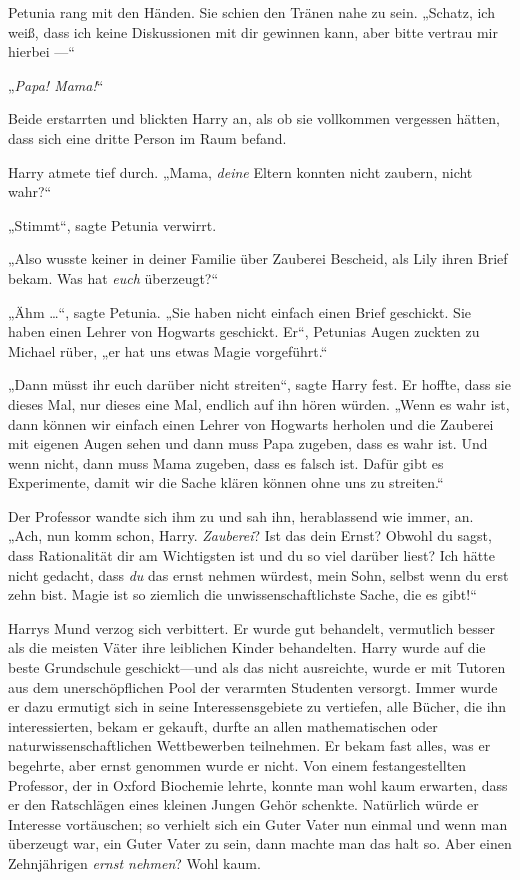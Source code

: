 {Petunia rang mit den Händen. Sie schien den Tränen nahe zu sein. „Schatz, ich weiß, dass ich keine Diskussionen mit dir gewinnen kann, aber bitte vertrau mir hierbei —“

„\emph{Papa! Mama!}“

Beide erstarrten und blickten Harry an, als ob sie vollkommen vergessen hätten, dass sich eine dritte Person im Raum befand.

Harry atmete tief durch. „Mama, \emph{deine} Eltern konnten nicht zaubern, nicht wahr?“

„Stimmt“, sagte Petunia verwirrt.

„Also wusste keiner in deiner Familie über Zauberei Bescheid, als Lily ihren Brief bekam. Was hat \emph{euch} überzeugt?“

„Ähm …“, sagte Petunia. „Sie haben nicht einfach einen Brief geschickt. Sie haben einen Lehrer von Hogwarts geschickt. Er“, Petunias Augen zuckten zu Michael rüber, „er hat uns etwas Magie vorgeführt.“

„Dann müsst ihr euch darüber nicht streiten“, sagte Harry fest. Er hoffte, dass sie dieses Mal, nur dieses eine Mal, endlich auf ihn hören würden. „Wenn es wahr ist, dann können wir einfach einen Lehrer von Hogwarts herholen und die Zauberei mit eigenen Augen sehen und dann muss Papa zugeben, dass es wahr ist. Und wenn nicht, dann muss Mama zugeben, dass es falsch ist. Dafür gibt es Experimente, damit wir die Sache klären können ohne uns zu streiten.“

Der Professor wandte sich ihm zu und sah ihn, herablassend wie immer, an. „Ach, nun komm schon, Harry. \emph{Zauberei}? Ist das dein Ernst? Obwohl du sagst, dass Rationalität dir am Wichtigsten ist und du so viel darüber liest? Ich hätte nicht gedacht, dass \emph{du} das ernst nehmen würdest, mein Sohn, selbst wenn du erst zehn bist. Magie ist so ziemlich die unwissenschaftlichste Sache, die es gibt!“

Harrys Mund verzog sich verbittert. Er wurde gut behandelt, vermutlich besser als die meisten Väter ihre leiblichen Kinder behandelten. Harry wurde auf die beste Grundschule geschickt—und als das nicht ausreichte, wurde er mit Tutoren aus dem unerschöpflichen Pool der verarmten Studenten versorgt. Immer wurde er dazu ermutigt sich in seine Interessensgebiete zu vertiefen, alle Bücher, die ihn interessierten, bekam er gekauft, durfte an allen mathematischen oder naturwissenschaftlichen Wettbewerben teilnehmen. Er bekam fast alles, was er begehrte, aber ernst genommen wurde er nicht. Von einem festangestellten Professor, der in Oxford Biochemie lehrte, konnte man wohl kaum erwarten, dass er den Ratschlägen eines kleinen Jungen Gehör schenkte. Natürlich würde er Interesse vortäuschen; so verhielt sich ein Guter Vater nun einmal und wenn man überzeugt war, ein Guter Vater zu sein, dann machte man das halt so. Aber einen Zehnjährigen \emph{ernst nehmen}? Wohl kaum.

}
